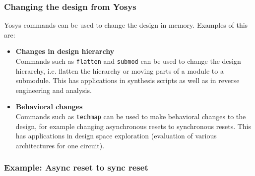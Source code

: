 \begin{frame}
\subsectionpage
\subsectionpagesuffix
\end{frame}

\subsubsection{Changing the design from Yosys}

\begin{frame}{\subsubsecname}
Yosys commands can be used to change the design in memory. Examples of this are:

\begin{itemize}
\item {\bf Changes in design hierarchy} \\
Commands such as {\tt flatten} and {\tt submod} can be used to change the design hierarchy, i.e.
flatten the hierarchy or moving parts of a module to a submodule. This has applications in synthesis
scripts as well as in reverse engineering and analysis.

\item {\bf Behavioral changes} \\
Commands such as {\tt techmap} can be used to make behavioral changes to the design, for example
changing asynchronous resets to synchronous resets. This has applications in design space exploration
(evaluation of various architectures for one circuit).
\end{itemize}
\end{frame}

\subsubsection{Example: Async reset to sync reset}

